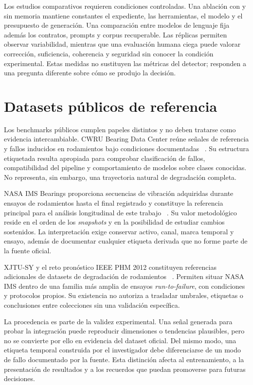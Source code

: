 Los estudios comparativos requieren condiciones controladas. Una ablación con
y sin memoria mantiene constantes el expediente, las herramientas, el modelo y
el presupuesto de generación. Una comparación entre modelos de lenguaje fija
además los contratos, prompts y corpus recuperable. Las réplicas permiten
observar variabilidad, mientras que una evaluación humana ciega puede valorar
corrección, suficiencia, coherencia y seguridad sin conocer la condición
experimental. Estas medidas no sustituyen las métricas del detector; responden
a una pregunta diferente sobre cómo se produjo la decisión.

\section{Datasets públicos de referencia}

Los benchmarks públicos cumplen papeles distintos y no deben tratarse como
evidencia intercambiable. CWRU Bearing Data Center reúne señales de referencia
y fallos inducidos en rodamientos bajo condiciones documentadas
~\cite{cwru_bearing_data_center,cwru_normal_baseline,cwru_12k_drive_end}. Su
estructura etiquetada resulta apropiada para comprobar clasificación de fallos,
compatibilidad del pipeline y comportamiento de modelos sobre clases conocidas.
No representa, sin embargo, una trayectoria natural de degradación completa.

NASA IMS Bearings proporciona secuencias de vibración adquiridas durante ensayos
de rodamientos hasta el final registrado y constituye la referencia principal
para el análisis longitudinal de este trabajo
~\cite{qiu2006_bearing_prognostics,nasa_pcoe_repository,nasa_ims_bearings_zip,nasa_ims_datagov}. Su valor
metodológico reside en el orden de los \textit{snapshots} y en la posibilidad de
estudiar cambios sostenidos. La interpretación exige conservar activo, canal,
marca temporal y ensayo, además de documentar cualquier etiqueta derivada que no
forme parte de la fuente oficial.

XJTU-SY y el reto pronóstico IEEE PHM 2012 constituyen referencias adicionales
de datasets de degradación de rodamientos
~\cite{xjtu_sy_bearing_dataset,ieee_phm_2012_pronostia_challenge}. Permiten situar
NASA IMS dentro de una familia más amplia de ensayos \textit{run-to-failure},
con condiciones y protocolos propios. Su existencia no autoriza a trasladar
umbrales, etiquetas o conclusiones entre colecciones sin una validación
específica.

La procedencia es parte de la validez experimental. Una señal generada para
probar la integración puede reproducir dimensiones o tendencias plausibles,
pero no se convierte por ello en evidencia del dataset oficial. Del mismo modo,
una etiqueta temporal construida por el investigador debe diferenciarse de un
modo de fallo documentado por la fuente. Esta distinción afecta al entrenamiento,
a la presentación de resultados y a los recuerdos que puedan promoverse para
futuras decisiones.

